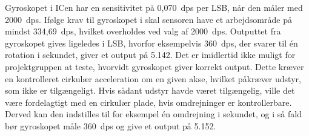 Gyroskopet i ICen har en sensitivitet på 0,070~dps per LSB, når den måler med 2000~dps. Ifølge krav til gyroskopet i  skal sensoren have et arbejdsområde på mindst 334,69~dps, hvilket overholdes ved valg af 2000~dps. Outputtet fra gyroskopet gives ligeledes i LSB, hvorfor eksempelvis 360~dps, der svarer til én rotation i sekundet, giver et output på 5.142. Det er imidlertid ikke muligt for projektgruppen at teste, hvorvidt gyroskopet giver korrekt output. Dette kræver en kontrolleret cirkulær acceleration om en given akse, hvilket påkræver udstyr, som ikke er tilgængeligt. Hvis sådant udstyr havde været tilgængelig, ville det være fordelagtigt med en cirkulær plade, hvis omdrejninger er kontrollerbare. Derved kan den indstilles til for eksempel én omdrejning i sekundet, og i så fald bør gyroskopet måle 360~dps og give et output på 5.152.
%
%
%
